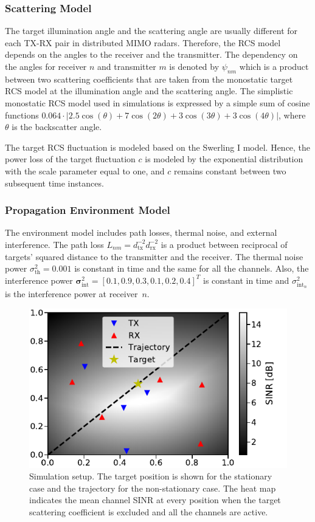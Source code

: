 \documentclass[english, 12pt, a4paper, elec, utf8, a-1b, online]{aaltothesis}
\newcommand{\abs}[1]{\lvert#1\rvert}
\newcommand{\thnoise}{\sigma^2_{\text{th}}}
\newcommand{\eintnoise}{\sigma^2_{\text{int}_{n}}}
\newcommand{\vintnoise}{\boldsymbol{\sigma}^2_{\text{int}}}
\newcommand{\epl}{L_{nm}}
\newcommand{\ercs}{\psi_{nm}}
\begin{document}
\subsubsection{Scattering Model}
\label{sec:sc_model}

The target illumination angle and the scattering angle are usually different for each TX-RX pair in distributed MIMO radars.
Therefore, the RCS model depends on the angles to the receiver and the transmitter.
The dependency on the angles for receiver $n$ and transmitter $m$ is denoted by $\ercs$ which is a product between two scattering coefficients that are taken from the monostatic target RCS model at the illumination angle and the scattering angle.
The simplistic monostatic RCS model used in simulations is expressed by a simple sum of cosine functions $0.064 \cdot \abs{2.5\cos(\theta) + 7\cos(2\theta) + 3\cos(3\theta) + 3\cos(4\theta)}$, where $\theta$ is the backscatter angle.

The target RCS fluctuation is modeled based on the Swerling I model.
Hence, the power loss of the target fluctuation $c$ is modeled by the exponential distribution with the scale parameter equal to one, and $c$ remains constant between two subsequent time instances.

\subsubsection{Propagation Environment Model}
\label{sec:env_model}

The environment model includes path losses, thermal noise, and external interference.
The path loss $\epl = d_\text{tx}^{-2} d_\text{rx}^{-2}$ is a product between
reciprocal of targets' squared distance to the transmitter and the receiver.
The thermal noise power $\thnoise=0.001$ is constant in time and the same for all the channels.
Also, the interference power $\vintnoise=[0.1, 0.9, 0.3, 0.1, 0.2, 0.4]^T$ is constant in time and $\eintnoise$ is the interference power at receiver~$n$.

\begin{figure}[!tb]
    \centering
    \includegraphics[width=.6\textwidth]{figures/MAB/env.pdf}
    \caption{Simulation setup.
    The target position is shown for the stationary case and the trajectory for the non-stationary case. 
    The heat map indicates the mean channel SINR at every position when the target scattering coefficient is excluded and all the channels are active.}
    \label{fig:env}
\end{figure}
\end{document}
